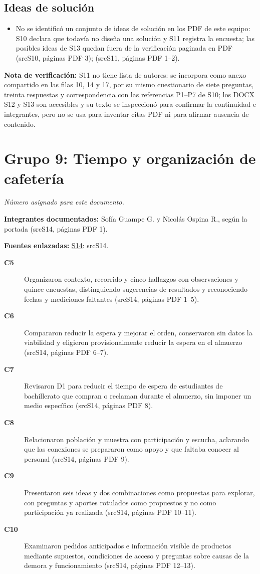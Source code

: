 \documentclass[11pt,a4paper]{article}
\newcommand{\evid}[2]{(\csname src#1\endcsname, páginas PDF #2)}
\begin{document}
\subsection*{Ideas de solución}
\begin{itemize}
\item No se identificó un conjunto de ideas de solución en los PDF de este equipo: S10 declara que todavía no diseña una solución y S11 registra la encuesta; las posibles ideas de S13 quedan fuera de la verificación paginada en PDF \evid{S10}{3}; \evid{S11}{1--2}.
\end{itemize}
{\small\textbf{Nota de verificación:} S11 no tiene lista de autores: se incorpora como anexo compartido en las filas 10, 14 y 17, por su mismo cuestionario de siete preguntas, treinta respuestas y correspondencia con las referencias P1--P7 de S10; los DOCX S12 y S13 son accesibles y su texto se inspeccionó para confirmar la continuidad e integrantes, pero no se usa para inventar citas PDF ni para afirmar ausencia de contenido.}
\clearpage
\section*{Grupo 9: Tiempo y organización de cafetería}
\textit{Número asignado para este documento.}

\textbf{Integrantes documentados:} Sofía Guampe G. y Nicolás Ospina R., según la portada \evid{S14}{1}.

\textbf{Fuentes enlazadas:} \hyperlink{fuente-S14}{S14}: \csname srcS14\endcsname.

\begin{description}
\item[\textbf{C5}] Organizaron contexto, recorrido y cinco hallazgos con observaciones y quince encuestas, distinguiendo sugerencias de resultados y reconociendo fechas y mediciones faltantes \evid{S14}{1--5}.
\item[\textbf{C6}] Compararon reducir la espera y mejorar el orden, conservaron sin datos la viabilidad y eligieron provisionalmente reducir la espera en el almuerzo \evid{S14}{6--7}.
\item[\textbf{C7}] Revisaron D1 para reducir el tiempo de espera de estudiantes de bachillerato que compran o reclaman durante el almuerzo, sin imponer un medio específico \evid{S14}{8}.
\item[\textbf{C8}] Relacionaron población y muestra con participación y escucha, aclarando que las conexiones se prepararon como apoyo y que faltaba conocer al personal \evid{S14}{9}.
\item[\textbf{C9}] Presentaron seis ideas y dos combinaciones como propuestas para explorar, con preguntas y aportes rotulados como propuestos y no como participación ya realizada \evid{S14}{10--11}.
\item[\textbf{C10}] Examinaron pedidos anticipados e información visible de productos mediante supuestos, condiciones de acceso y preguntas sobre causas de la demora y funcionamiento \evid{S14}{12--13}.
\end{description}
\end{document}
